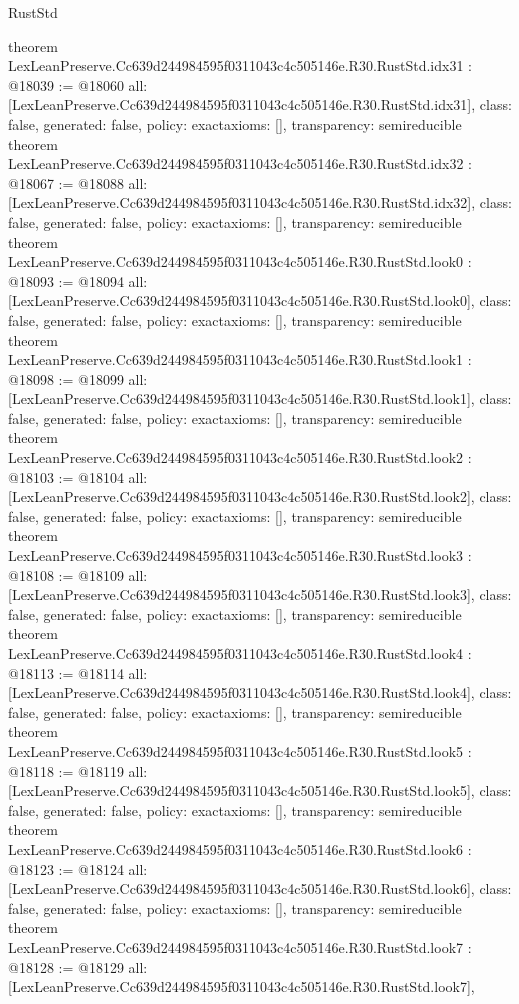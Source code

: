 \begin{lexlean}{RustStd}
\begin{coremodule}
{}
theorem LexLeanPreserve.Cc639d244984595f0311043c4c505146e.R30.RustStd.idx31 : @18039 := @18060 {
  all: [LexLeanPreserve.Cc639d244984595f0311043c4c505146e.R30.RustStd.idx31],
  class: false,
  generated: false,
  policy: exact{axioms: []},
  transparency: semireducible
}
theorem LexLeanPreserve.Cc639d244984595f0311043c4c505146e.R30.RustStd.idx32 : @18067 := @18088 {
  all: [LexLeanPreserve.Cc639d244984595f0311043c4c505146e.R30.RustStd.idx32],
  class: false,
  generated: false,
  policy: exact{axioms: []},
  transparency: semireducible
}
theorem LexLeanPreserve.Cc639d244984595f0311043c4c505146e.R30.RustStd.look0 : @18093 := @18094 {
  all: [LexLeanPreserve.Cc639d244984595f0311043c4c505146e.R30.RustStd.look0],
  class: false,
  generated: false,
  policy: exact{axioms: []},
  transparency: semireducible
}
theorem LexLeanPreserve.Cc639d244984595f0311043c4c505146e.R30.RustStd.look1 : @18098 := @18099 {
  all: [LexLeanPreserve.Cc639d244984595f0311043c4c505146e.R30.RustStd.look1],
  class: false,
  generated: false,
  policy: exact{axioms: []},
  transparency: semireducible
}
theorem LexLeanPreserve.Cc639d244984595f0311043c4c505146e.R30.RustStd.look2 : @18103 := @18104 {
  all: [LexLeanPreserve.Cc639d244984595f0311043c4c505146e.R30.RustStd.look2],
  class: false,
  generated: false,
  policy: exact{axioms: []},
  transparency: semireducible
}
theorem LexLeanPreserve.Cc639d244984595f0311043c4c505146e.R30.RustStd.look3 : @18108 := @18109 {
  all: [LexLeanPreserve.Cc639d244984595f0311043c4c505146e.R30.RustStd.look3],
  class: false,
  generated: false,
  policy: exact{axioms: []},
  transparency: semireducible
}
theorem LexLeanPreserve.Cc639d244984595f0311043c4c505146e.R30.RustStd.look4 : @18113 := @18114 {
  all: [LexLeanPreserve.Cc639d244984595f0311043c4c505146e.R30.RustStd.look4],
  class: false,
  generated: false,
  policy: exact{axioms: []},
  transparency: semireducible
}
theorem LexLeanPreserve.Cc639d244984595f0311043c4c505146e.R30.RustStd.look5 : @18118 := @18119 {
  all: [LexLeanPreserve.Cc639d244984595f0311043c4c505146e.R30.RustStd.look5],
  class: false,
  generated: false,
  policy: exact{axioms: []},
  transparency: semireducible
}
theorem LexLeanPreserve.Cc639d244984595f0311043c4c505146e.R30.RustStd.look6 : @18123 := @18124 {
  all: [LexLeanPreserve.Cc639d244984595f0311043c4c505146e.R30.RustStd.look6],
  class: false,
  generated: false,
  policy: exact{axioms: []},
  transparency: semireducible
}
theorem LexLeanPreserve.Cc639d244984595f0311043c4c505146e.R30.RustStd.look7 : @18128 := @18129 {
  all: [LexLeanPreserve.Cc639d244984595f0311043c4c505146e.R30.RustStd.look7],
}
\end{coremodule}
\end{lexlean}
